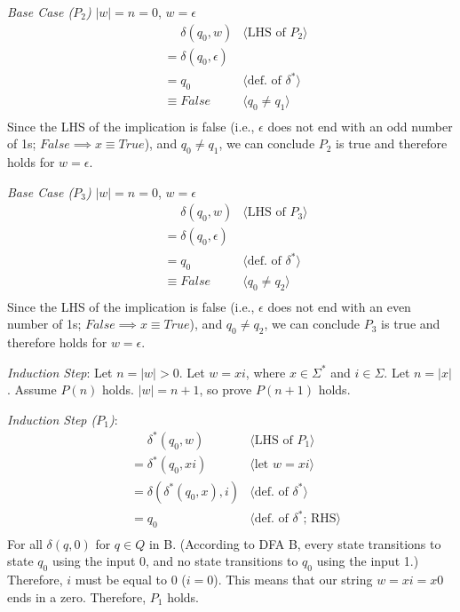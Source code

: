 \documentclass[11pt,fleqn]{article}
\newcommand{\pnote}[1]{\langle \mbox{#1} \rangle}
\begin{document}
    \emph{Base Case ($P_2$)} $|w| = n = 0$, $w = \epsilon$
    \begin{align*}
      &\phantom{{}=} \delta(q_0, w) & \pnote{LHS of $P_2$}\\
      &= \delta(q_0, \epsilon) \\
      &= q_0       & \pnote{def. of $\delta^*$}\\
      &\equiv False       & \pnote{$q_0 \neq q_1$}\\
    \end{align*}
    Since the LHS of the implication is false (i.e., $\epsilon$ does not end with an odd number of 1s; $False \implies x \equiv True$), and $q_0 \neq q_1$, we can conclude $P_2$ is true and therefore holds for $w = \epsilon$.

    \emph{Base Case ($P_3$)} $|w| = n = 0$, $w = \epsilon$
    \begin{align*}
      &\phantom{{}=} \delta(q_0, w) & \pnote{LHS of $P_3$}\\
      &= \delta(q_0, \epsilon) \\
      &= q_0       & \pnote{def. of $\delta^*$}\\
      &\equiv False       & \pnote{$q_0 \neq q_2$}\\
    \end{align*}
    Since the LHS of the implication is false (i.e., $\epsilon$ does not end with an even number of 1s; $False \implies x \equiv True$), and $q_0 \neq q_2$, we can conclude $P_3$ is true and therefore holds for $w = \epsilon$.

    \emph{Induction Step}: Let $n = |w| > 0$. Let $w = xi$, where $x \in \Sigma^*$ and $i \in \Sigma$. Let $n = |x|$. Assume $P(n)$ holds. $|w| = n+1$, so prove $P(n+1)$ holds.

    \emph{Induction Step ($P_1$)}:
    \begin{align*}
      &\phantom{{}=} \delta^*(q_0, w) & \pnote{LHS of $P_1$}\\
      &= \delta^*(q_0, xi) & \pnote{let $w = xi$}\\
      &= \delta(\delta^*(q_0, x), i)      & \pnote{def. of $\delta^*$}\\
      &= q_0       & \pnote{def. of $\delta^*$; RHS}\\
    \end{align*}
    For all $\delta(q, 0)$ for $q \in Q$ in B. (According to DFA B, every state transitions to state $q_0$ using the input 0, and no state transitions to $q_0$ using the input 1.) Therefore, $i$ must be equal to 0 ($i=0$). This means that our string $w = xi = x0$ ends in a zero. Therefore, $P_1$ holds.
\end{document}
